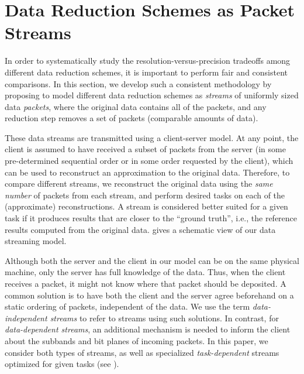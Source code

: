 \section{Data Reduction Schemes as Packet Streams}\label{sec:terminologies}

In order to systematically study the resolution-versus-precision tradeoffs among different data
reduction schemes, it is important to perform fair and consistent comparisons.  In this section, we
develop such a consistent methodology by proposing to model different data reduction schemes as
\emph{streams} of uniformly sized data \emph{packets}, where the original data contains all of the
packets, and any reduction step removes a set of packets (comparable amounts of data).

These data streams are transmitted using a client-server model. At any point, the client is assumed
to have received a subset of packets from the server (in some pre-determined sequential order or 
in some order requested by the client), which can be used to reconstruct an
approximation to the original data. Therefore, to compare different streams, we reconstruct the
original data using the \emph{same number} of packets from each stream, and perform desired tasks on
each of the (approximate) reconstructions. A stream is considered better suited for a given task if
it produces results that are closer to the ``ground truth'', i.e., the reference results computed
from the original data.  gives a schematic view of our data streaming model.

Although both the server and the client in our model can be on the same physical machine, only the
server has full knowledge of the data. Thus, when the client receives a packet, it might not know
where that packet should be deposited. A common solution is to have both the client and the server
agree beforehand on a static ordering of packets, independent of the data. We use the term
\emph{data-independent streams} to refer to streams using such solutions. In contrast, for
\emph{data-dependent streams}, an additional mechanism is needed to inform the client about the
subbands and bit planes of incoming packets. In this paper, we consider both types of streams, as
well as specialized \emph{task-dependent} streams optimized for given tasks (see
).

